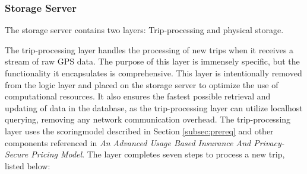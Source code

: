 \subsubsection{Storage Server}\label{subsec:storageserver}
The storage server contains two layers: Trip-processing and physical storage.

The trip-processing layer handles the processing of new trips when it receives a stream of raw GPS data. The purpose of this layer is immensely specific, but the functionality it encapsulates is comprehensive. This layer is intentionally removed from the logic layer and placed on the storage server to optimize the use of computational resources. It also ensures the fastest possible retrieval and updating of data in the database, as the trip-processing layer can utilize localhost querying, removing any network communication overhead. The trip-processing layer uses the scoringmodel described in Section \ref{subsec:prereq} and other components referenced in \textit{An Advanced Usage Based Insurance And Privacy-Secure Pricing Model}\cite{sw9_report}. The layer completes seven steps to process a new trip, listed below:

